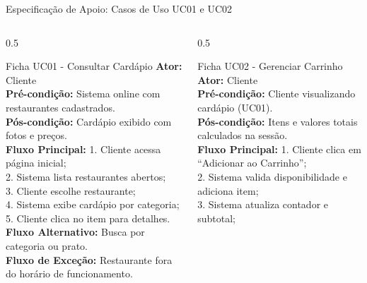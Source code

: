 \documentclass[10pt]{beamer}
\begin{document}
\begin{frame}{Especificação de Apoio: Casos de Uso UC01 e UC02}
    \begin{columns}
        \begin{column}{0.5\textwidth}
            \begin{block}{\scriptsize Ficha UC01 - Consultar Cardápio}
                \tiny
                \textbf{Ator:} Cliente \\
                \textbf{Pré-condição:} Sistema online com restaurantes cadastrados. \\
                \textbf{Pós-condição:} Cardápio exibido com fotos e preços. \\
                \textbf{Fluxo Principal:}
                1. Cliente acessa página inicial; \\
                2. Sistema lista restaurantes abertos; \\
                3. Cliente escolhe restaurante; \\
                4. Sistema exibe cardápio por categoria; \\
                5. Cliente clica no item para detalhes. \\
                \textbf{Fluxo Alternativo:} Busca por categoria ou prato. \\
                \textbf{Fluxo de Exceção:} Restaurante fora do horário de funcionamento.
            \end{block}
        \end{column}
        \begin{column}{0.5\textwidth}
            \begin{block}{\scriptsize Ficha UC02 - Gerenciar Carrinho}
                \tiny
                \textbf{Ator:} Cliente \\
                \textbf{Pré-condição:} Cliente visualizando cardápio (UC01). \\
                \textbf{Pós-condição:} Itens e valores totais calculados na sessão. \\
                \textbf{Fluxo Principal:}
                1. Cliente clica em ``Adicionar ao Carrinho''; \\
                2. Sistema valida disponibilidade e adiciona item; \\
                3. Sistema atualiza contador e subtotal; \\

\end{block}
\end{column}
\end{columns}
\end{frame}
\end{document}
